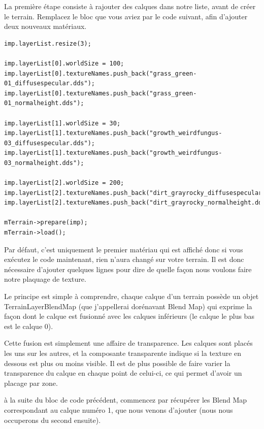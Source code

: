 La première étape consiste à rajouter des calques dans notre liste, avant de créer le terrain. Remplacez le bloc que vous aviez par le code suivant, afin d'ajouter deux nouveaux matériaux.



\begin{lstlisting}[caption={Ajout de calques}]
imp.layerList.resize(3);

imp.layerList[0].worldSize = 100;
imp.layerList[0].textureNames.push_back("grass_green-01_diffusespecular.dds");
imp.layerList[0].textureNames.push_back("grass_green-01_normalheight.dds");

imp.layerList[1].worldSize = 30;
imp.layerList[1].textureNames.push_back("growth_weirdfungus-03_diffusespecular.dds");
imp.layerList[1].textureNames.push_back("growth_weirdfungus-03_normalheight.dds");

imp.layerList[2].worldSize = 200;
imp.layerList[2].textureNames.push_back("dirt_grayrocky_diffusespecular.dds");
imp.layerList[2].textureNames.push_back("dirt_grayrocky_normalheight.dds");

mTerrain->prepare(imp);
mTerrain->load();
\end{lstlisting}

Par défaut, c'est uniquement le premier matériau qui est affiché donc si vous exécutez le code maintenant, rien n'aura changé sur votre terrain.  Il est donc nécessaire d'ajouter quelques lignes pour dire de quelle fa\c{c}on nous voulons faire notre plaquage de texture.\newline

Le principe est simple à comprendre, chaque calque d'un terrain possède un objet TerrainLayerBlendMap (que j'appellerai dorénavant Blend Map) qui exprime la fa\c{c}on dont le calque est fusionné avec les calques inférieurs (le calque le plus bas est le calque 0).

Cette fusion est simplement une affaire de transparence. Les calques sont placés les uns sur les autres, et la composante transparente indique si la texture en dessous est plus ou moins visible. Il est de plus possible de faire varier la transparence du calque en chaque point de celui-ci, ce qui permet d'avoir un placage par zone.\newline

à la suite du bloc de code précédent, commencez par récupérer les Blend Map correspondant au calque numéro 1, que nous venons d'ajouter (nous nous occuperons du second ensuite).

